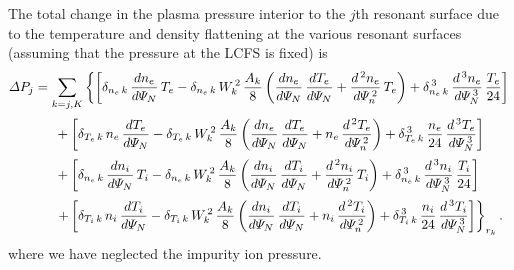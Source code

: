 \documentclass[notitlepage,12pt]{article}
\begin{document}
The total change in the plasma pressure interior to the $j$th resonant surface due to the temperature and
density flattening at the various resonant surfaces (assuming that the pressure at the LCFS is fixed) is
\begin{align}
{\mit\Delta}P_j &=\sum_{k=j,K} 
\left\{\left[\delta_{n_e\,k}\,\frac{dn_e}{d{\mit\Psi}_N}\,T_e- \delta_{n_e\,k}\,W_k^{\,2}\,\frac{A_k}{8}\left(\frac{dn_e}{d{\mit\Psi}_N}\,\frac{dT_e}{d{\mit\Psi}_N}+\frac{d^{\,2}n_e}{d{\mit\Psi}_n^{\,2}}\,T_e\right)
+ \delta_{n_e\,k}^{\,3}\,\frac{d^{\,3}n_e}{d{\mit\Psi}_N^{\,3}}\,\frac{T_e}{24}\right]\right.
\nonumber\\[0.5ex]
&\phantom{++}+\left[\delta_{T_e\,k}\,n_e\,\frac{dT_e}{d{\mit\Psi}_N}- \delta_{T_e\,k}\,W_k^{\,2}\,\frac{A_k}{8}\left(\frac{dn_e}{d{\mit\Psi}_N}\,\frac{dT_e}{d{\mit\Psi}_N}+
 n_e\,\frac{d^{\,2}T_e}{d{\mit\Psi}_n^{\,2}}\right)
+ \delta_{T_e\,k}^{\,3}\,\frac{n_e}{24}\,\frac{d^{\,3}T_e}{d{\mit\Psi}_N^{\,3}}\right]\nonumber\\[0.5ex]
&\phantom{++}+\left[\delta_{n_e\,k}\,\frac{dn_i}{d{\mit\Psi}_N}\,T_i- \delta_{n_e\,k}\,W_k^{\,2}\,\frac{A_k}{8}\left(\frac{dn_i}{d{\mit\Psi}_N}\,\frac{dT_i}{d{\mit\Psi}_N}+\frac{d^{\,2}n_i}{d{\mit\Psi}_n^{\,2}}
\,T_i\right)+ \delta_{n_e\,k}^{\,3}\,\frac{d^{\,3}n_i}{d{\mit\Psi}_N^{\,3}}\,\frac{T_i}{24}\right]
\nonumber\\[0.5ex]
&\phantom{++}\left.+\left[\delta_{T_i\,k}\,n_i\,\frac{dT_i}{d{\mit\Psi}_N}- \delta_{T_i\,k}\,W_k^{\,2}\,\frac{A_k}{8}\left(\frac{dn_i}{d{\mit\Psi}_N}\,\frac{dT_i}{d{\mit\Psi}_N}+n_i\,\frac{d^{\,2}T_i}{d{\mit\Psi}_n^{\,2}}\right)
+ \delta_{T_i\,k}^{\,3}\,\frac{n_i}{24}\,\frac{d^{\,3}T_i}{d{\mit\Psi}_N^{\,3}}\right]\right\}_{r_k}.
\end{align}
where
we have neglected the impurity ion pressure. 
\end{document}
